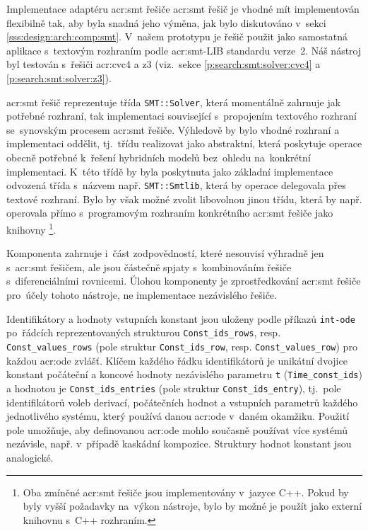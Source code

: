 \documentclass[thesis=M,czech]{FITthesis}[2012/06/26]
\newcommand{\acrlabel}[1]{acr:#1}
\newcommand{\acr}[1]{\acrshort{\acrlabel{#1}}}
\newcommand{\id}[1]{\texttt{#1}}
\newcommand{\rf}[1]{\ref{#1}}
\begin{document}
\begin{section}{Implementace adaptéru \acr{smt} řešiče}\label{s:impl:smt}
\acr{smt} řešič je vhodné mít implementován flexibilně tak,
aby byla snadná jeho výměna, jak bylo diskutováno
v~sekci \rf{sss:design:arch:comp:smt}.
V~našem prototypu je řešič použit jako samostatná aplikace
s~textovým rozhraním podle \acr{smt}-LIB standardu verze~2.
Náš nástroj byl testován s~řešiči \acr{cvc}4 a z3
(viz.~sekce \rf{p:search:smt:solver:cvc4} a \rf{p:search:smt:solver:z3}).

\acr{smt} řešič reprezentuje třída \id{SMT::\-Solver},
která momentálně zahrnuje jak potřebné rozhraní, tak implementaci
související s~propojením textového rozhraní
se~synovským procesem \acr{smt} řešiče.
Výhledově by bylo vhodné rozhraní a implementaci oddělit,
tj.~třídu realizovat jako abstraktní,
která poskytuje operace obecně potřebné
k~řešení hybridních modelů
bez~ohledu na~konkrétní implementaci.
K~této třídě by byla poskytnuta
jako základní implementace odvozená třída
s~názvem např. \id{SMT::\-Smtlib},
která by operace delegovala přes textové rozhraní.
Bylo by však možné zvolit libovolnou jinou třídu,
která by např. operovala přímo s~programovým
rozhraním konkrétního \acr{smt} řešiče jako knihovny%
\footnote{Oba zmíněné \acr{smt} řešiče jsou implementovány v~jazyce C++.
Pokud by byly vyšší požadavky na~výkon nástroje,
bylo by možné je použít jako externí knihovnu s~C++ rozhraním.}.

Komponenta zahrnuje i~část zodpovědností,
které nesouvisí výhradně jen s~\acr{smt} řešičem,
ale jsou částečně spjaty s~kombinováním
řešiče s~diferenciálními rovnicemi.
Úlohou komponenty je zprostředkování \acr{smt} řešiče
pro~účely tohoto nástroje,
ne implementace nezávislého řešiče.


\begin{paragraph}{Identifikátory a hodnoty}\label{p:impl:smt:consts}
vstupních konstant jsou uloženy podle příkazů \id{int\--ode}
po~řádcích reprezentovaných strukturou \id{Const\_\-ids\_\-rows},
resp. \id{Const\_\-values\_\-rows}
(pole struktur \id{Const\_\-ids\_\-row},
resp. \id{Const\_\-values\_\-row})
pro každou \acr{ode} zvlášť.
Klíčem každého řádku identifikátorů je unikátní dvojice konstant
počáteční a koncové hodnoty nezávislého parametru \id{t}
(\id{Time\_\-const\_\-ids})
a hodnotou je \id{Const\_\-ids\_\-entries}
(pole struktur \id{Const\_\-ids\_\-entry}),
tj.~pole identifikátorů voleb derivací, počátečních hodnot
a vstupních parametrů každého jednotlivého systému,
který používá danou \acr{ode} v~daném okamžiku.
Použití pole umožňuje,
aby definovanou \acr{ode}
mohlo současně používat více systémů nezávisle,
např. v~případě kaskádní kompozice.
Struktury hodnot konstant jsou analogické.


\end{paragraph}
\end{section}
\end{document}
